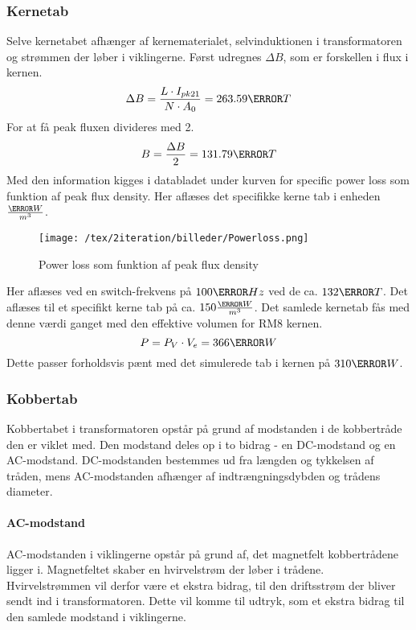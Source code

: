 \subsubsection{Kernetab}
Selve kernetabet afhænger af kernematerialet, selvinduktionen i transformatoren og strømmen der løber i viklingerne\cite{core-loss}. Først udregnes $\Delta B$, som er forskellen i flux i kernen.
\begin{equation} 
\Delta B = \frac{L \cdot I_{pk21}}{N \cdot A_0} = 263.59\milli T
\end{equation}
For at få peak fluxen divideres med 2. 
\begin{equation} \label{B}
B = \frac{\Delta B}{2} = 131.79\milli T
\end{equation}
Med den information kigges i databladet under kurven for specific power loss som funktion af peak flux density. Her aflæses det specifikke kerne tab i enheden $\frac{\kilo W}{m^3}$.
\begin{figure}[H]
	\center
	\texttt{[image: /tex/2iteration/billeder/Powerloss.png]}
	\caption{Power loss som funktion af peak flux density}
	\label{fig: Powerloss}
\end{figure}
\noindent Her aflæses ved en switch-frekvens på $100\kilo Hz$ ved de ca. $132\milli T$. Det aflæses til et specifikt kerne tab på ca. $150\frac{\kilo W}{m^3}$.
Det samlede kernetab fås med denne værdi ganget med den effektive volumen for RM8 kernen.
\begin{equation} \label{DeltaB}
P = P_V \cdot V_e = 366\milli W
\end{equation}
Dette passer forholdsvis pænt med det simulerede tab i kernen på $310\milli W$.

\subsubsection{Kobbertab}
Kobbertabet i transformatoren opstår på grund af modstanden i de kobbertråde den er viklet med. Den modstand deles op i to bidrag - en DC-modstand og en AC-modstand. DC-modstanden bestemmes ud fra længden og tykkelsen af tråden, mens AC-modstanden afhænger af indtrængningsdybden og trådens diameter. 

\paragraph{AC-modstand}
AC-modstanden i viklingerne opstår på grund af, det magnetfelt kobbertrådene ligger i. Magnetfeltet skaber en hvirvelstrøm der løber i trådene. Hvirvelstrømmen vil derfor være et ekstra bidrag, til den driftsstrøm der bliver sendt ind i transformatoren. Dette vil komme til udtryk, som et ekstra bidrag til den samlede modstand i viklingerne. 

